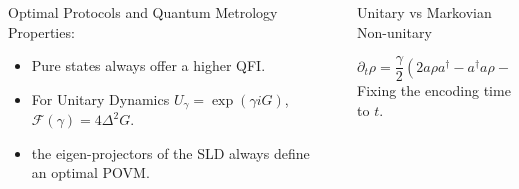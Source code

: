 \documentclass[final]{beamer}
\newlength{\sepwidth}
\newlength{\colwidth}
\newcommand{\separatorcolumn}{\begin{column}{\sepwidth}\end{column}}
\begin{document}
\begin{frame}[t]
\begin{columns}[t]
\begin{column}{\colwidth}
\begin{block}{Optimal Protocols and Quantum Metrology}
  Properties:
\begin{itemize}
        \item Pure states always offer a higher QFI.
        \item For Unitary Dynamics $U_{\gamma}=\exp({\gamma iG})$, $\mathcal{F}(\gamma)=4\Delta^{2}G$.
        \item the eigen-projectors of the SLD always define an optimal POVM.
\end{itemize}
\end{block}
\end{column}
\separatorcolumn
\begin{column}{\colwidth}


\begin{block}{Unitary vs Markovian Non-unitary}
     
     \vspace{-0.05\linewidth}
  {\Large
    \begin{equation*}
      \partial_{t}\rho = \frac{\gamma}{2}(2a\rho a^{\dagger}-a^{\dagger}a\rho - \rho a^{\dagger}a)
    \end{equation*}
}
Fixing the encoding time to $t$.
\end{block}


\end{column}
\end{columns}
\end{frame}
\end{document}
